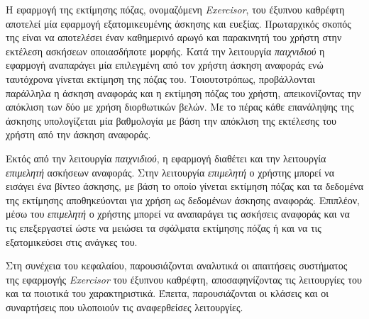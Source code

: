 Η εφαρμογή της εκτίμησης πόζας, ονομαζόμενη \textsl{Exercisor}, του έξυπνου καθρέφτη αποτελεί μία εφαρμογή εξατομικευμένης άσκησης και ευεξίας. Πρωταρχικός σκοπός της είναι να αποτελέσει έναν καθημερινό αρωγό και παρακινητή του χρήστη στην εκτέλεση ασκήσεων οποιασδήποτε μορφής. Κατά την λειτουργία \textsl{παιχνιδιού} η εφαρμογή αναπαράγει μία επιλεγμένη από τον χρήστη άσκηση αναφοράς ενώ ταυτόχρονα γίνεται εκτίμηση της πόζας του. Τοιουτοτρόπως, προβάλλονται παράλληλα η άσκηση αναφοράς και η εκτίμηση πόζας του χρήστη, απεικονίζοντας την απόκλιση των δύο με χρήση διορθωτικών βελών. Με το πέρας κάθε επανάληψης της άσκησης υπολογίζεται μία βαθμολογία με βάση την απόκλιση της εκτέλεσης του χρήστη από την άσκηση αναφοράς.

Εκτός από την λειτουργία \textsl{παιχνιδιού}, η εφαρμογή διαθέτει και την λειτουργία \textsl{επιμελητή} ασκήσεων αναφοράς. Στην λειτουργία \textsl{επιμελητή} ο χρήστης μπορεί να εισάγει ένα βίντεο άσκησης, με βάση το οποίο γίνεται εκτίμηση πόζας και τα δεδομένα της εκτίμησης αποθηκεύονται για χρήση ως δεδομένων άσκησης αναφοράς. Επιπλέον, μέσω του \textsl{επιμελητή} ο χρήστης μπορεί να αναπαράγει τις ασκήσεις αναφοράς και να τις επεξεργαστεί ώστε να μειώσει τα σφάλματα εκτίμησης πόζας ή και να τις εξατομικεύσει στις ανάγκες του.

Στη συνέχεια του κεφαλαίου, παρουσιάζονται αναλυτικά οι απαιτήσεις συστήματος της εφαρμογής \textsl{Exercisor} του έξυπνου καθρέφτη, αποσαφηνίζοντας τις λειτουργίες του και τα ποιοτικά του χαρακτηριστικά. Έπειτα, παρουσιάζονται οι κλάσεις και οι συναρτήσεις που υλοποιούν τις αναφερθείσες λειτουργίες.